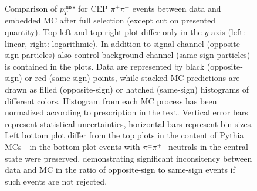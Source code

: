 \begin{figure}[h]
{\begin{subfigure}[b]{\linewidth}
  \end{subfigure}\\
    \begin{minipage}[t][1.042\linewidth][t]{\linewidth}\vspace{20pt}
    \caption[Comparison of $p_{T}^{\text{miss}}$ for CEP $\pi^{+}\pi^{-}$ events between data and embedded MC.]{Comparison of $p_{T}^{\text{miss}}$ for CEP $\pi^{+}\pi^{-}$ events between data and embedded MC after full selection (except cut on presented quantity). Top left and top right plot differ only in the $y$-axis (left: linear, right: logarithmic). In addition to signal channel (opposite-sign particles) also control background channel (same-sign particles) is contained in the plots. Data are represented by black (opposite-sign) or red (same-sign) points, while stacked MC predictions are drawn as filled (opposite-sign) or hatched (same-sign) histograms of different colors. Histogram from each MC process has been normalized according to prescription in the text. Vertical error bars represent statistical uncertainties, horizontal bars represent bin sizes.\\Left bottom plot differ from the top plots in the content of Pythia MCs - in the bottom plot events with $\pi^{\pm}\pi^{\mp}$+neutrals in the central state were preserved, demonstrating significant inconsitency between data and MC in the ratio of opposite-sign to same-sign events if such events are not rejected.}\label{fig:Ratio_MissingPt}%
  \end{minipage}
}%
\end{figure}

